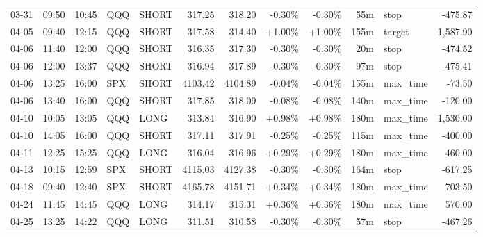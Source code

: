 \documentclass[11pt,a4paper]{article}
\begin{document}
\begin{center}
\begin{longtable}{>{\color{txtmain}}l l l l l r r r r r >{\color{txtmain}}l r}
03-31 & 09:50 & 10:45 & QQQ & SHORT & 317.25 & 318.20 & \textcolor{lossred}{-0.30\%} & \textcolor{lossred}{-0.30\%} & 55m & stop & \textcolor{lossred}{-475.87} \\
04-05 & 09:40 & 12:15 & QQQ & SHORT & 317.58 & 314.40 & \textcolor{wingreen}{+1.00\%} & \textcolor{wingreen}{+1.00\%} & 155m & target & \textcolor{wingreen}{1,587.90} \\
04-06 & 11:40 & 12:00 & QQQ & SHORT & 316.35 & 317.30 & \textcolor{lossred}{-0.30\%} & \textcolor{lossred}{-0.30\%} & 20m & stop & \textcolor{lossred}{-474.52} \\
04-06 & 12:00 & 13:37 & QQQ & SHORT & 316.94 & 317.89 & \textcolor{lossred}{-0.30\%} & \textcolor{lossred}{-0.30\%} & 97m & stop & \textcolor{lossred}{-475.41} \\
04-06 & 13:25 & 16:00 & SPX & SHORT & 4103.42 & 4104.89 & \textcolor{lossred}{-0.04\%} & \textcolor{lossred}{-0.04\%} & 155m & max\_time & \textcolor{lossred}{-73.50} \\
04-06 & 13:40 & 16:00 & QQQ & SHORT & 317.85 & 318.09 & \textcolor{lossred}{-0.08\%} & \textcolor{lossred}{-0.08\%} & 140m & max\_time & \textcolor{lossred}{-120.00} \\
04-10 & 10:05 & 13:05 & QQQ & LONG & 313.84 & 316.90 & \textcolor{wingreen}{+0.98\%} & \textcolor{wingreen}{+0.98\%} & 180m & max\_time & \textcolor{wingreen}{1,530.00} \\
04-10 & 14:05 & 16:00 & QQQ & SHORT & 317.11 & 317.91 & \textcolor{lossred}{-0.25\%} & \textcolor{lossred}{-0.25\%} & 115m & max\_time & \textcolor{lossred}{-400.00} \\
04-11 & 12:25 & 15:25 & QQQ & LONG & 316.04 & 316.96 & \textcolor{wingreen}{+0.29\%} & \textcolor{wingreen}{+0.29\%} & 180m & max\_time & \textcolor{wingreen}{460.00} \\
04-13 & 10:15 & 12:59 & SPX & SHORT & 4115.03 & 4127.38 & \textcolor{lossred}{-0.30\%} & \textcolor{lossred}{-0.30\%} & 164m & stop & \textcolor{lossred}{-617.25} \\
04-18 & 09:40 & 12:40 & SPX & SHORT & 4165.78 & 4151.71 & \textcolor{wingreen}{+0.34\%} & \textcolor{wingreen}{+0.34\%} & 180m & max\_time & \textcolor{wingreen}{703.50} \\
04-24 & 11:45 & 14:45 & QQQ & LONG & 314.17 & 315.31 & \textcolor{wingreen}{+0.36\%} & \textcolor{wingreen}{+0.36\%} & 180m & max\_time & \textcolor{wingreen}{570.00} \\
04-25 & 13:25 & 14:22 & QQQ & LONG & 311.51 & 310.58 & \textcolor{lossred}{-0.30\%} & \textcolor{lossred}{-0.30\%} & 57m & stop & \textcolor{lossred}{-467.26} \\

\end{longtable}
\end{center}
\end{document}

